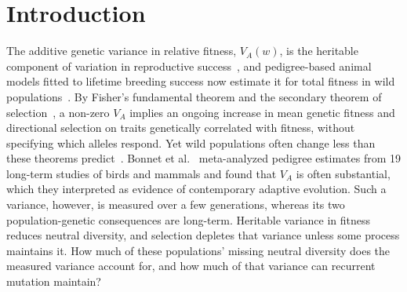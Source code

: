 \documentclass{article}
\begin{document}
    \linenumbers
\fi

\section{Introduction}
The additive genetic variance in relative fitness, $V_A(w)$, is the heritable component of variation in reproductive success~\cite{crow1958,robertson1961}, and pedigree-based animal models fitted to lifetime breeding success now estimate it for total fitness in wild populations~\cite{kruuk2004,postma2014}. By Fisher's fundamental theorem and the secondary theorem of selection~\cite{robertson1966,price1970}, a non-zero $V_A$ implies an ongoing increase in mean genetic fitness and directional selection on traits genetically correlated with fitness, without specifying which alleles respond. Yet wild populations often change less than these theorems predict~\cite{merila2001,mawass2025contrast}. Bonnet et al.~\cite{bonnet2022} meta-analyzed pedigree estimates from 19 long-term studies of birds and mammals and found that $V_A$ is often substantial, which they interpreted as evidence of contemporary adaptive evolution. Such a variance, however, is measured over a few generations, whereas its two population-genetic consequences are long-term. Heritable variance in fitness reduces neutral diversity, and selection depletes that variance unless some process maintains it. How much of these populations' missing neutral diversity does the measured variance account for, and how much of that variance can recurrent mutation maintain?
\end{document}
